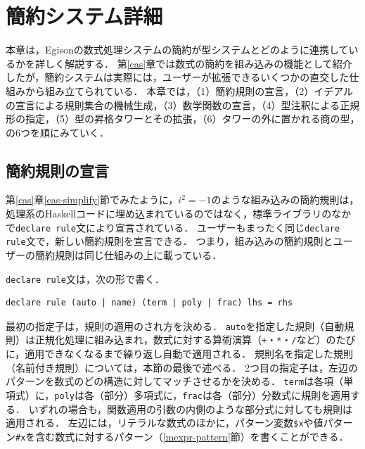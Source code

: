 \chapter{簡約システム詳細}\label{casdetail}

本章は，Egisonの数式処理システムの簡約が型システムとどのように連携しているかを詳しく解説する．
第\ref{cas}章では数式の簡約を組み込みの機能として紹介したが，簡約システムは実際には，ユーザーが拡張できるいくつかの直交した仕組みから組み立てられている．
本章では，（1）簡約規則の宣言，（2）イデアルの宣言による規則集合の機械生成，（3）数学関数の宣言，（4）型注釈による正規形の指定，（5）型の昇格タワーとその拡張，（6）タワーの外に置かれる商の型，の6つを順にみていく．

\section{簡約規則の宣言}\label{cas-rule}

第\ref{cas}章\ref{cas-simplify}節でみたように，$i^2 = -1$のような組み込みの簡約規則は，処理系のHaskellコードに埋め込まれているのではなく，標準ライブラリのなかで\lstinline{declare rule}文により宣言されている．
ユーザーもまったく同じ\lstinline{declare rule}文で，新しい簡約規則を宣言できる．
つまり，組み込みの簡約規則とユーザーの簡約規則は同じ仕組みの上に載っている．

\lstinline{declare rule}文は，次の形で書く．
\begin{lstlisting}[language=egison,numbers=none]
declare rule (auto | name) (term | poly | frac) lhs = rhs
\end{lstlisting}
最初の指定子は，規則の適用のされ方を決める．
\lstinline{auto}を指定した規則（自動規則）は正規化処理に組み込まれ，数式に対する算術演算（\lstinline{+}・\lstinline{*}・\lstinline{/}など）のたびに，適用できなくなるまで繰り返し自動で適用される．
規則名を指定した規則（名前付き規則）については，本節の最後で述べる．
2つ目の指定子は，左辺のパターンを数式のどの構造に対してマッチさせるかを決める．
\lstinline{term}は各項（単項式）に，\lstinline{poly}は各（部分）多項式に，\lstinline{frac}は各（部分）分数式に規則を適用する．
いずれの場合も，関数適用の引数の内側のような部分式に対しても規則は適用される．
左辺には，リテラルな数式のほかに，パターン変数\lstinline{$x}や値パターン\lstinline{#x}を含む数式に対するパターン（\ref{mexpr-pattern}節）を書くことができる．

